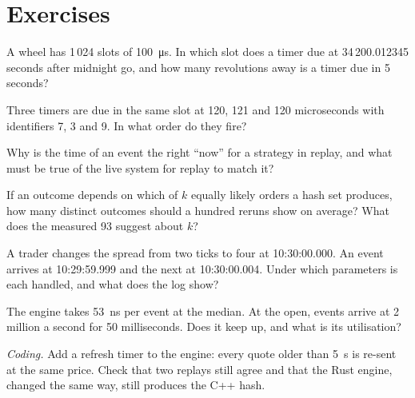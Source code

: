 \section{Exercises}

\begin{exercise}[$\star$]\label{exo:ll:the-strategy-engine:1}
A wheel has 1\,024 slots of \qty{100}{\micro\second}. In which slot does a timer due at 34\,200.012345 seconds after midnight go,
and how many revolutions away is a timer due in 5 seconds?
\end{exercise}

\begin{exercise}[$\star$]\label{exo:ll:the-strategy-engine:2}
Three timers are due in the same slot at 120, 121 and 120 microseconds with identifiers 7, 3 and 9. In what order do they fire?
\end{exercise}

\begin{exercise}[$\star$]\label{exo:ll:the-strategy-engine:3}
Why is the time of an event the right ``now'' for a strategy in replay, and what must be true of the live system for replay to
match it?
\end{exercise}

\begin{exercise}[$\star\star$]\label{exo:ll:the-strategy-engine:4}
If an outcome depends on which of $k$ equally likely orders a hash set produces, how many distinct outcomes should a hundred
reruns show on average? What does the measured 93 suggest about $k$?
\end{exercise}

\begin{exercise}[$\star\star$]\label{exo:ll:the-strategy-engine:5}
A trader changes the spread from two ticks to four at 10:30:00.000. An event arrives at 10:29:59.999 and the next at
10:30:00.004. Under which parameters is each handled, and what does the log show?
\end{exercise}

\begin{exercise}[$\star\star$]\label{exo:ll:the-strategy-engine:6}
The engine takes \qty{53}{\nano\second} per event at the median. At the open, events arrive at 2 million a second for 50
milliseconds. Does it keep up, and what is its utilisation?
\end{exercise}

\begin{exercise}[$\star\star\star$]\label{exo:ll:the-strategy-engine:7}
\emph{Coding.} Add a refresh timer to the engine: every quote older than \qty{5}{\second} is re-sent at the same price. Check
that two replays still agree and that the Rust engine, changed the same way, still produces the C++ hash.
\end{exercise}

